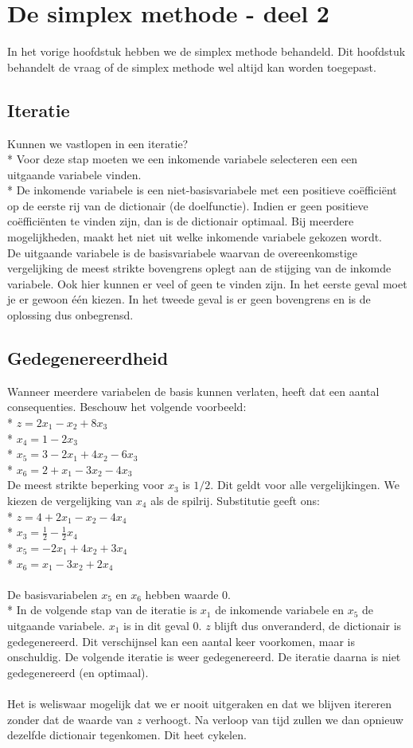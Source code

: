\documentclass[10pt]{article}
\begin{document}
\section{De simplex methode - deel 2}
In het vorige hoofdstuk hebben we de simplex methode behandeld. Dit hoofdstuk behandelt de vraag of de simplex methode wel altijd kan worden toegepast.
\subsection{Iteratie}
Kunnen we vastlopen in een iteratie?\\*
Voor deze stap moeten we een inkomende variabele selecteren een een uitgaande variabele vinden.\\*
De inkomende variabele is een niet-basisvariabele met een positieve co\"effici\"ent op de eerste rij van de dictionair (de doelfunctie). Indien er geen positieve co\"effici\"enten te vinden zijn, dan is de dictionair optimaal. Bij meerdere mogelijkheden, maakt het niet uit welke inkomende variabele gekozen wordt.\\
De uitgaande variabele is de basisvariabele waarvan de overeenkomstige vergelijking de meest strikte bovengrens oplegt aan de stijging van de inkomde variabele. Ook hier kunnen er veel of geen te vinden zijn. In het eerste geval moet je er gewoon \'e\'en kiezen. In het tweede geval is er geen bovengrens en is de oplossing dus onbegrensd.
\subsection{Gedegenereerdheid}
Wanneer meerdere variabelen de basis kunnen verlaten, heeft dat een aantal consequenties. Beschouw het volgende voorbeeld:\\*
$z = 2x_1 - x_2 + 8x_3$\\*
$x_4 = 1 - 2x_3$\\*
$x_5 = 3 - 2x_1 + 4x_2 - 6x_3$\\*
$x_6 = 2 + x_1 - 3x_2 - 4x_3$\\
De meest strikte beperking voor $x_3$ is $1/2$. Dit geldt voor alle vergelijkingen. We kiezen de vergelijking van $x_4$ als de spilrij. Substitutie geeft ons:\\*
$z = 4 + 2x_1 - x_2 - 4x_4$\\*
$x_3 = \frac{1}{2} - \frac{1}{2}x_4$\\*
$x_5 = -2x_1 + 4x_2 + 3x_4$\\*
$x_6 = x_1 - 3x_2 + 2x_4$\\\\
De basisvariabelen $x_5$ en $x_6$ hebben waarde $0$.\\*
In de volgende stap van de iteratie is $x_1$ de inkomende variabele en $x_5$ de uitgaande variabele. $x_1$ is in dit geval $0$. $z$ blijft dus onveranderd, de dictionair is gedegenereerd. Dit verschijnsel kan een aantal keer voorkomen, maar is onschuldig. De volgende iteratie is weer gedegenereerd. De iteratie daarna is niet gedegenereerd (en optimaal).\\\\
Het is weliswaar mogelijk dat we er nooit uitgeraken en dat we blijven itereren zonder dat de waarde van $z$ verhoogt. Na verloop van tijd zullen we dan opnieuw dezelfde dictionair tegenkomen. Dit heet cykelen.
\end{document}
